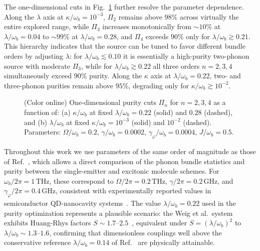 \documentclass{ws-ijmpb}
\begin{document}
The one-dimensional cuts in Fig.~\ref{fig:purity_2qd_cuts} further resolve the parameter 
dependence. Along the $\lambda$ axis at $\kappa/\omega_b = 10^{-3}$, $\Pi_2$ remains above 
$98\%$ across virtually the entire explored range, while $\Pi_3$ increases monotonically from 
$\sim 10\%$ at $\lambda/\omega_b = 0.04$ to $\sim 99\%$ at $\lambda/\omega_b = 0.28$, and 
$\Pi_4$ exceeds $90\%$ only for $\lambda/\omega_b \gtrsim 0.21$. This hierarchy indicates that 
the source can be tuned to favor different bundle orders by adjusting $\lambda$: for 
$\lambda/\omega_b \lesssim 0.10$ it is essentially a high-purity two-phonon source with 
moderate $\Pi_3$, while for $\lambda/\omega_b \gtrsim 0.22$ all three orders $n = 2, 3, 4$ 
simultaneously exceed $90\%$ purity. Along the $\kappa$ axis at $\lambda/\omega_b = 0.22$, 
two- and three-phonon purities remain above $95\%$, degrading only for 
$\kappa/\omega_b \gtrsim 10^{-2}$.

\begin{figure}[H]
	\centering
	
	\caption{(Color online) One-dimensional purity cuts $\Pi_n$ for $n = 2, 3, 4$ as a function of: 
		(a) $\kappa/\omega_b$ at fixed $\lambda/\omega_b = 0.22$ (solid) and $0.28$ (dashed), 
		and (b) $\lambda/\omega_b$ at fixed $\kappa/\omega_b = 10^{-3}$ (solid) and $10^{-2}$ 
		(dashed). Parameters: $\Omega/\omega_b = 0.2$, $\gamma/\omega_b = 0.0002$, 
		$\gamma_\varphi/\omega_b = 0.0004$, $J/\omega_b = 0.5$.}
	\label{fig:purity_2qd_cuts}
\end{figure}

Throughout this work we use parameters of the same order of magnitude as those of 
Ref.~\cite{bin2020}, which allows a direct comparison of the phonon bundle statistics and 
purity between the single-emitter and excitonic molecule schemes. For 
$\omega_b/2\pi = 1\,\mathrm{THz}$, these correspond to $\Omega/2\pi = 0.2\,\mathrm{THz}$, 
$\gamma/2\pi = 0.2\,\mathrm{GHz}$, and $\gamma_\varphi/2\pi = 0.4\,\mathrm{GHz}$, consistent 
with experimentally reported values in semiconductor QD-nanocavity 
systems~\cite{weig2004,rozas2009,borri2001}. The value $\lambda/\omega_b = 0.22$ used in the 
purity optimization represents a plausible scenario: the Weig et al.\ system exhibits 
Huang-Rhys factors $S \sim 1.7$--$2.5$~\cite{weig2004}, equivalent under 
$S = (\lambda/\omega_b)^2$ to $\lambda/\omega_b \sim 1.3$--$1.6$, confirming that 
dimensionless couplings well above the conservative reference $\lambda/\omega_b = 0.14$ of 
Ref.~\cite{bin2020} are physically attainable.
\end{document}
